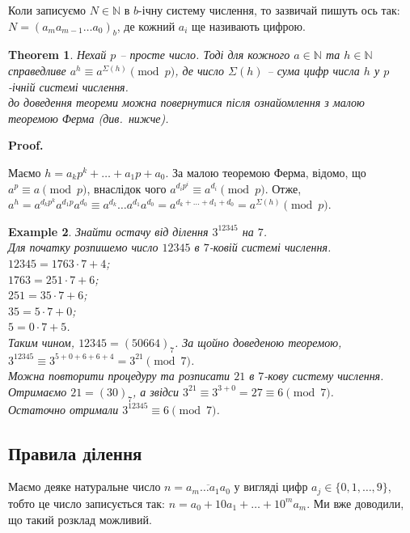 \documentclass[a4paper, 14pt]{extarticle}
\makeatletter
\theoremstyle{theoremdd}
\newtheorem{theorem}{Theorem}[subsection]
\theoremstyle{theoremdd}
\theoremstyle{theoremdd}
\theoremstyle{theoremdd}
\newtheorem{example}[theorem]{Example}
\theoremstyle{theoremdd}
\theoremstyle{theoremdd}
\theoremstyle{theoremdd}
\theoremstyle{theoremdd}
\def\qed{$\blacksquare$}
\renewenvironment{proof}[1][Proof.\\]{\par
\pushQED{\hfill \qed}%
\normalfont \topsep6\p@\@plus6\p@\relax
\trivlist
\item\relax
{\bfseries
#1\@addpunct{.}}\hspace\labelsep\ignorespaces
}{%
\popQED\endtrivlist\@endpefalse
}
\makeatother
\begin{document}
Коли записуємо $N \in \mathbb{N}$ в $b$-ічну систему числення, то зазвичай пишуть ось так: $N = (a_m a_{m-1} \dots a_0)_{b}$, де кожний $a_i$ ще називають цифрою.

\begin{theorem}
Нехай $p$ -- просте число. Тоді для кожного $a \in \mathbb{N}$ та $h \in \mathbb{N}$ справедливе $a^h \equiv a^{\Sigma (h)} \pmod p$, де число $\Sigma (h)$ -- сума цифр числа $h$ у $p$-ічній системі числення.\\
\textit{до доведення теореми можна повернутися після ознайомлення з малою теоремою Ферма (див.\ нижче).}
\end{theorem}

\begin{proof}
Маємо $h = a_k p^k + \dots + a_1 p + a_0$. За малою теоремою Ферма, відомо, що $a^p \equiv a \pmod p$, внаслідок чого $a^{d_i p^i} \equiv a^{d_i} \pmod p$. Отже,\\
$a^h = a^{d_k p^k} a^{d_1 p} a^{d_0} \equiv a^{d_k} \dots a^{d_1} a^{d_0} = a^{d_k + \dots + d_1 + d_0} = a^{\Sigma(h)} \pmod p$.
\end{proof}

\begin{example}
Знайти остачу від ділення $3^{12345}$ на $7$.\\
Для початку розпишемо число $12345$ в $7$-ковій системі числення.\\
$12345 = 1763 \cdot 7 + 4$;\\
$1763 = 251 \cdot 7 + 6$;\\
$251 = 35 \cdot 7 + 6$;\\
$35 = 5 \cdot 7 + 0$;\\
$5 = 0 \cdot 7 + 5$.\\
Таким чином, $12345 = (50664)_7$. За щойно доведеною теоремою,\\
$3^{12345} \equiv 3^{5 + 0 + 6 + 6 + 4} = 3^{21} \pmod 7$.\\
Можна повторити процедуру та розписати $21$ в $7$-кову систему числення. Отримаємо $21 = (30)_7$, а звідси $3^{21} \equiv 3^{3+0} = 27 \equiv 6 \pmod 7$.\\
Остаточно отримали $3^{12345} \equiv 6 \pmod 7$.
\end{example}

\subsection{Правила ділення}
Маємо деяке натуральне число $n = \overline{a_m\dots a_1a_0}$ у вигляді цифр $a_j \in \{0,1,\dots,9\}$, тобто це число записується так: $n = a_0 + 10 a_1 + \dots + 10^m a_m$. Ми вже доводили, що такий розклад можливий.
\end{document}
